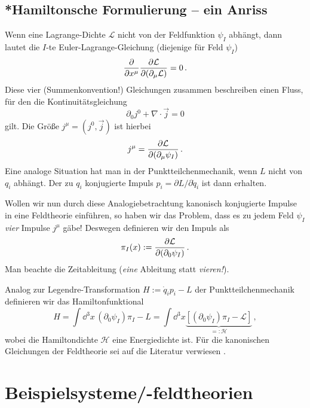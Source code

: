 \documentclass[paper=a4, fontsize=11.0pt, abstractoff, DIV12]{scrartcl}
\newcommand{\LD}{\ensuremath{\mathcal{L}}}
\newcommand{\HD}{\ensuremath{\mathcal{H}}}
\begin{document}
\subsection{*Hamiltonsche Formulierung -- ein Anriss}

Wenn eine Lagrange-Dichte $\LD$ nicht von der Feldfunktion $\psi_I$ abhängt,
dann lautet die $I$-te Euler-Lagrange-Gleichung (diejenige für Feld $\psi_I$)
\begin{equation}
\firstpderiv{}{x^\mu} \firstpderiv{\LD}{(\partial_\mu\LD)} = 0\,.
\end{equation}
Diese vier (Summenkonvention!) Gleichungen zusammen beschreiben einen Fluss,
für den die Kontinuitätsgleichung
\begin{equation}
\partial_0 j^0 + \nabla \cdot\vec j = 0
\end{equation}
gilt. Die Größe $j^\mu=(j^0, \vec j)$ ist hierbei
\begin{equation}
j^\mu = \firstpderiv{\LD}{(\partial_\mu\psi_I)}\,.
\end{equation}
Eine analoge Situation hat man in der Punktteilchenmechanik, wenn $L$ nicht
von $q_i$ abhängt. Der zu $q_i$ konjugierte Impuls $p_i = \partial
L/\partial\dot q_i$ ist dann erhalten.

Wollen wir nun durch diese Analogiebetrachtung kanonisch konjugierte Impulse
in eine Feldtheorie einführen, so haben wir das Problem, dass es zu jedem
Feld $\psi_I$ \emph{vier} Impulse $j^\mu$ gäbe! Deswegen definieren wir den
Impuls als
\begin{equation}
\pi_I(x) := \firstpderiv{\LD}{(\partial_0 \psi_I)}\,.
\end{equation}
Man beachte die Zeitableitung (\emph{eine} Ableitung statt \emph{vieren!}).

Analog zur Legendre-Transformation $H := \dot q_i p_i - L$ der
Punktteilchenmechanik definieren wir das Hamiltonfunktional
\begin{equation}
H = \int\!\dd^3 x\,(\partial_0\psi_I)\pi_I - L = \int\!\dd^3x\underbrace{\left[(\partial_0\psi_I)\pi_I - \LD\right]}_{=:\HD}\,,
\end{equation}
wobei die Hamiltondichte $\HD$ eine Energiedichte ist. Für die kanonischen
Gleichungen der Feldtheorie sei auf die Literatur verwiesen \cite
{JoseSaletan}.

\section{Beispielsysteme/-feldtheorien}
\end{document}

